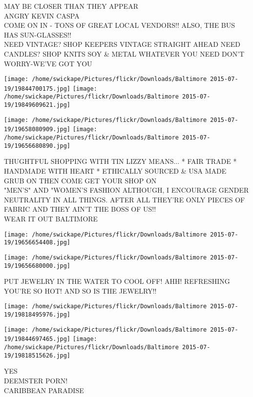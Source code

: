 \documentclass[10pt,letterpaper]{article}
\begin{document}
MAY BE CLOSER THAN THEY APPEAR\\
ANGRY KEVIN CASPA\\
COME ON IN {-} TONS OF GREAT LOCAL VENDORS!! ALSO, THE BUS HAS SUN{-}GLASSES!!\\
NEED VINTAGE?  SHOP KEEPERS VINTAGE STRAIGHT AHEAD NEED CANDLES? SHOP KNITS SOY \& METAL WHATEVER YOU NEED DON'T WORRY{-}WE'VE GOT YOU
\pagebreak

\texttt{[image: /home/swickape/Pictures/flickr/Downloads/Baltimore 2015-07-19/19844700175.jpg]}
\texttt{[image: /home/swickape/Pictures/flickr/Downloads/Baltimore 2015-07-19/19849609621.jpg]}

\texttt{[image: /home/swickape/Pictures/flickr/Downloads/Baltimore 2015-07-19/19658080909.jpg]}
\texttt{[image: /home/swickape/Pictures/flickr/Downloads/Baltimore 2015-07-19/19656680890.jpg]}

THUGHTFUL SHOPPING WITH TIN LIZZY MEANS... * FAIR TRADE * HANDMADE WITH HEART * ETHICALLY SOURCED \& USA MADE\\
GRUB ON THEN COME GET YOUR SHOP ON\\
"MEN'S" AND "WOMEN'S  FASHION ALTHOUGH, I ENCOURAGE GENDER NEUTRALITY IN ALL THINGS.  AFTER ALL THEY'RE ONLY PIECES OF FABRIC AND THEY AIN'T THE BOSS OF US!!\\
WEAR IT OUT BALTIMORE
\pagebreak

\texttt{[image: /home/swickape/Pictures/flickr/Downloads/Baltimore 2015-07-19/19656654408.jpg]}

\vspace{0.25in}
\texttt{[image: /home/swickape/Pictures/flickr/Downloads/Baltimore 2015-07-19/19656680000.jpg]}

PUT JEWELRY IN THE WATER TO COOL OFF!  AHH!  REFRESHING\\
YOU'RE SO HOT!  AND SO IS THE JEWELRY!!
\pagebreak

\texttt{[image: /home/swickape/Pictures/flickr/Downloads/Baltimore 2015-07-19/19818495976.jpg]}

\vspace{0.25in}
\texttt{[image: /home/swickape/Pictures/flickr/Downloads/Baltimore 2015-07-19/19844697465.jpg]}
\texttt{[image: /home/swickape/Pictures/flickr/Downloads/Baltimore 2015-07-19/19818515626.jpg]}

YES\\
DEEMSTER PORN!\\
CARIBBEAN PARADISE
\pagebreak
\end{document}
